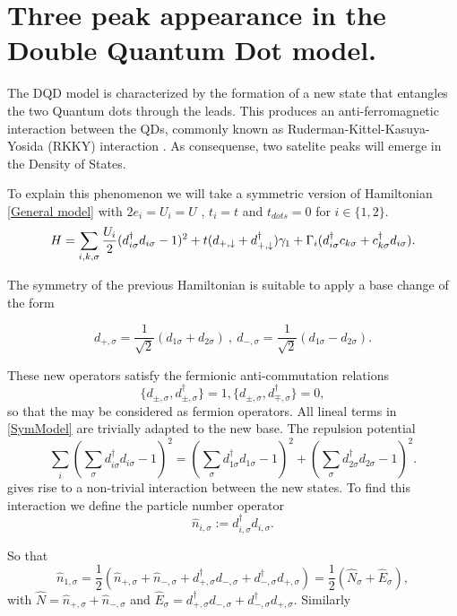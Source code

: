 \chapter{Three peak appearance in the Double Quantum Dot model.\label{sec:DoublePeak}}

The DQD model is characterized by the formation of 
a new state that entangles the two Quantum dots through the leads. This produces an anti-ferromagnetic interaction between the QDs, commonly known
as Ruderman-Kittel-Kasuya-Yosida (RKKY) interaction \citep{ruderman_indirect_1954,yosida_magnetic_1957}. As consequense, two satelite peaks will emerge in the Density of States.  




To explain this phenomenon we will take a symmetric version of Hamiltonian \eqref{General model} with $2e_i =U_i =U $ , $t_i = t$ and $t_{dots} = 0$ for $i \in \{ 1,2 \}$. 
\begin{equation}
H =\sum_{i,k,\sigma}  \frac{U_i}{2}(d_{i \sigma}^{\dagger}d_{i \sigma}-1)^{2} + t(d_{+,\downarrow}+d^\dagger_{+,\downarrow})\gamma_1 + \Gamma_i(d^\dagger_{i\sigma}c_{k\sigma}+c^\dagger_{k\sigma}d_{i\sigma}).
\label{SymModel}
\end{equation}

The symmetry of the previous Hamiltonian is suitable to apply a base change of the form 
 
\[
  d_{+ , \sigma} = \frac{1}{\sqrt{2}} (d_{1\sigma} +d_{2\sigma}) \ , \ 
  d_{- , \sigma} = \frac{1}{\sqrt{2}} (d_{1\sigma} -d_{2\sigma}).
\]


These new operators satisfy the fermionic anti-commutation relations 
 \[ \{d_{\pm , \sigma}, d^\dagger_{\pm , \sigma}\} = 1 , \{ d_{\pm , \sigma}, d^\dagger_{\mp , \sigma}\} = 0,
\]
 so that the may be considered as fermion operators. All lineal terms in \eqref{SymModel} are trivially adapted to the new base. The repulsion potential 
$$\sum_{i} (\sum_{\sigma} d_{i \sigma}^{\dagger}d_{i \sigma}-1)^{2} = (\sum_{\sigma} d_{1 \sigma}^{\dagger}d_{1 \sigma}-1)^{2} + (\sum_{\sigma} d_{2 \sigma}^{\dagger}d_{2 \sigma}-1)^{2} . $$ 
gives rise to a non-trivial interaction between the new states. To find this interaction we define the particle number operator  
\[\hat{n}_{i,\sigma}:= d^\dagger_{i,\sigma}d_{i,\sigma}.\] 

So that 
\[\hat{n}_{1,\sigma}= \frac{1}{2} \left( \hat{n}_{+,\sigma} + \hat{n}_{-,\sigma} + d^\dagger_{+,\sigma}d_{-,\sigma} + d^\dagger_{-,\sigma}d_{+,\sigma} \right) = \frac{1}{2} \left( \hat{N}_\sigma + \hat{E}_\sigma \right),  \]
with $\hat{N} = \hat{n}_{+,\sigma} + \hat{n}_{-,\sigma}$ and $\hat{E}_\sigma = d^\dagger_{+,\sigma}d_{-,\sigma} + d^\dagger_{-,\sigma}d_{+,\sigma}. $ Similarly 

